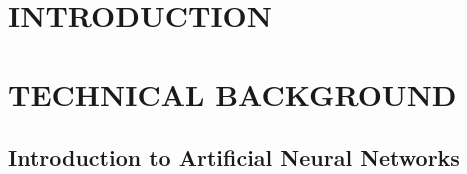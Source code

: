 \documentclass[thesis]{deutez}
\begin{document}
\begin{abstract}
		
\end{abstract}

\begin{ozet}
	
\end{ozet}
 
\tableofcontents
\listoftables
\listoffigures

\start

\chapter{INTRODUCTION}

\chapter{TECHNICAL BACKGROUND}

\section{Introduction to Artificial Neural Networks}
\end{document}
